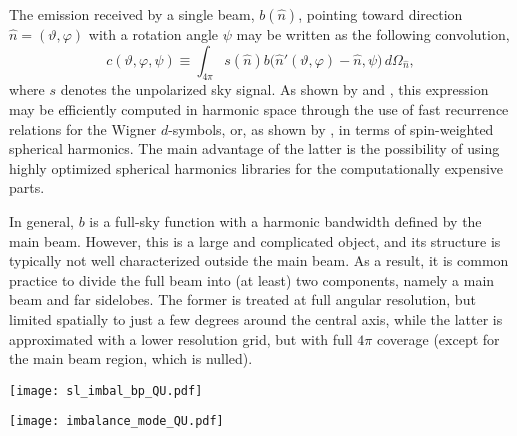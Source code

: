 \documentclass[twocolumn]{aa}
\def\WMAP{\emph{WMAP}}
\def\commander{\texttt{Commander}}
\newcommand{\Q}[0]{\textit Q}
\newcommand{\cvar}{\ensuremath{c(\vartheta, \varphi, \psi)}}
\begin{document}
The emission received by a single beam, $b(\hat{n})$, pointing toward direction
$\hat{n}=(\vartheta,\varphi)$ with a rotation angle $\psi$ may be written as
the following convolution,
\begin{equation}
  \cvar \equiv \int_{4\pi} s(\hat{n})
  b\big(\hat{n}'(\vartheta,\varphi)-\hat{n},\psi\big)\, d\Omega_{\hat{n}},
  \label{eq:convolution}
\end{equation}
where $s$ denotes the unpolarized sky signal. As shown by \citet{wandelt2001}
and \citet{prezeau2010}, this expression may be efficiently computed in
harmonic space through the use of fast recurrence relations for the Wigner
$d$-symbols, or, as shown by \citet{bp08}, in terms of spin-weighted spherical
harmonics. The main advantage of the latter is the possibility of using highly
optimized spherical harmonics libraries for the computationally expensive
parts.

In general, $b$ is a full-sky function with a harmonic bandwidth defined by the
main beam. However, this is a large and complicated object, and its structure
is typically not well characterized outside the main beam. As a result, it is common
practice to divide the full beam into (at least) two components, namely a main
beam and far sidelobes. The former is treated at full angular resolution, but
limited spatially to just a few degrees around the central axis, while the
latter is approximated with a lower resolution grid, but with full $4\pi$
coverage (except for the main beam region, which is nulled).

\begin{figure*}
	\centering
	  \texttt{[image: sl\_imbal\_bp\_QU.pdf]}
	\caption{Estimates of \WMAP{} \Q1-band polarized sidelobe pickup. Note the differing dynamic ranges for each panel.
	(\textit{Top:}) \commander{} estimate of the polarized sidelobe pickup, taking into account only the bandpass differences between each channel.
	(\textit{Bottom:}) \commander{} estimate of the polarized sidelobe pickup, taking into account only the transmission imbalance parameters.}
	\label{fig:P_sidelobes}

  \centering
	\texttt{[image: imbalance\_mode\_QU.pdf]}
	\caption{Official \WMAP\ \Q-band imbalance template. Note that units are arbitrary, as this is an eigenmode to be downweighted in the low-resolution likelihood analysis.}
	\label{fig:imbal_templates}
\end{figure*}
\end{document}
